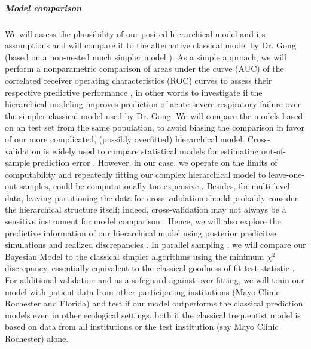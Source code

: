 \documentclass[11pt,notitlepage]{article}
\begin{document}
\subparagraph*{Model comparison}
We will assess the plausibility of our posited hierarchical model and its assumptions \cite{Gelman_predictive_2000,GelmanMengStern1996} and will compare it to the alternative classical model by Dr. Gong (based on a non-nested much simpler model \cite{Herridge_12594312}). As a simple approach, we will perform a nonparametric comparison of areas under the curve (AUC) of the correlated receiver operating characteristics (ROC) curves \cite{DeLong_3203132} to assess their respective predictive performance \cite{Newcombe_22890972}, in other words to investigate if the hierarchical modeling improves prediction of acute severe respiratory failure over the simpler classical model used by Dr. Gong. We will compare the models based on an test set from the same population, to avoid biasing the comparison in favor of our more complicated, (possibly overfitted) hierarchical model. Cross-validation is widely used to compare statistical models for estimating out-of-sample prediction error \cite{Vehtari_12396570}. However, in our case, we operate on the limits of computability and repeatedly fitting our complex hierarchical model to leave-one-out samples, could be computationally too expensive \cite{Gelman_Aki_2014predictive}. Besides, for multi-level data, leaving partitioning the data for cross-validation should probably consider the hierarchical structure itself; indeed, cross-validation may not always be a sensitive instrument for model comparison \cite{wang_predictive_2014}. Hence, we will also explore the predictive information of our hierarchical model using posterior predicitve simulations and realized discrepancies \cite{Gelman_Aki_2014predictive,Gelman_predictive_2000,GelmanMengStern1996}. In parallel sampling \cite{Congdon_modelcomparison_2005}, we will compare our Bayesian Model to the classical simpler algorithms using the minimum $\chi^{2}$ discrepancy, essentially equivalent to the classical
goodness-of-fit test statistic \cite{GelmanMengStern1996}. For additional validation and as a safeguard against over-fitting, we will train our model with patient data from other participating institutions (Mayo Clinic Rochester and Florida) and test if our model outperforms the classical prediction models even in other ecological settings, both if the classical frequentist model is based on data from all institutions or the test institution (say Mayo Clinic Rochester) alone. 
\end{document}
